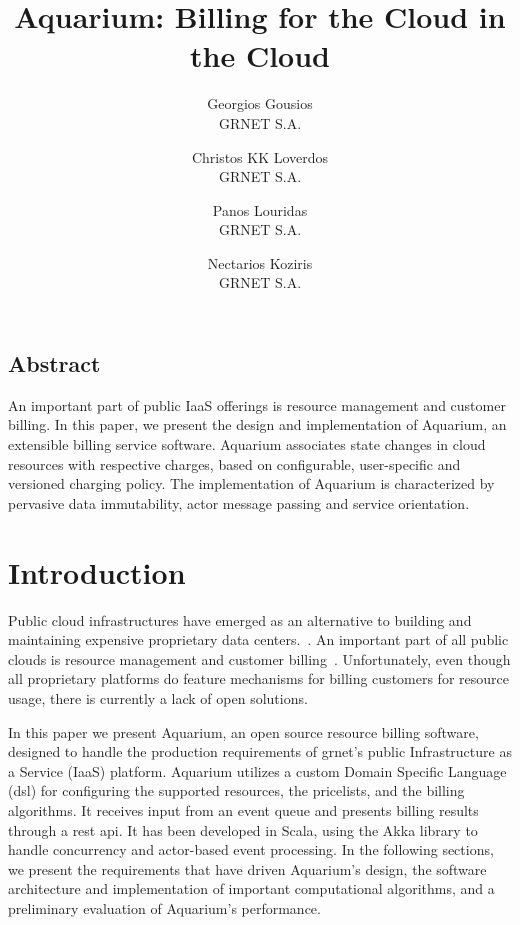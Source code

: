 \documentclass[letterpaper,twocolumn,10pt]{article}
\newcommand{\grnet}{{\sc grnet}\xspace}
\begin{document}
\date{}

\title{Aquarium: Billing for the Cloud in the Cloud}

\author{
{\rm Georgios Gousios}\\
GRNET S.A.
\and
{\rm Christos KK Loverdos}\\
GRNET S.A.
\and
{\rm Panos Louridas}\\
GRNET S.A.
\and
{\rm Nectarios Koziris}\\
GRNET S.A.
} %

\maketitle


\thispagestyle{empty}

\subsection*{Abstract}

An important part of public IaaS offerings is resource management and
customer billing. In this paper, we present the design and
implementation of Aquarium, an extensible billing service software.
Aquarium associates state changes in cloud resources with respective
charges, based on configurable, user-specific and versioned charging
policy. The implementation of Aquarium is characterized by pervasive
data immutability, actor message passing and service orientation.

\section{Introduction}

Public cloud infrastructures have emerged as an alternative to
building and maintaining expensive proprietary data
centers.~\cite{Lourid10}. An important part of all public clouds is
resource management and customer billing~\cite{Armbr10}.
Unfortunately, even though all proprietary platforms do feature
mechanisms for billing customers for resource usage, there is
currently a lack of open solutions.

In this paper we present Aquarium, an open source resource billing software,
designed to handle the production  requirements of \grnet's public
Infrastructure as a Service (IaaS) platform. Aquarium utilizes a custom Domain
Specific Language ({\sc dsl}) for configuring the supported resources, the
pricelists, and the billing algorithms. It receives input from an event queue
and presents billing results through a {\sc rest api}. It has been developed
in Scala, using the Akka library to handle concurrency and actor-based
event processing. In the following sections, we present the requirements
that have driven Aquarium's design, the software architecture and
implementation of important computational algorithms, and a preliminary
evaluation of Aquarium's performance. 
\end{document}
